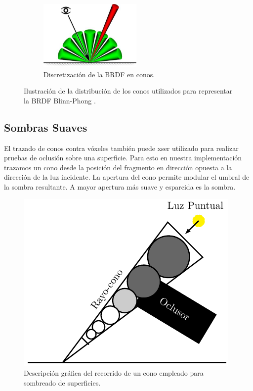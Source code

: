 \begin{figure}[H]
\begin{subfigure}[t]{.33\linewidth}
		\includegraphics[width=\linewidth]{media/brdfallcone.png}
		\caption*{Discretización de la BRDF en conos.}
	\end{subfigure}
	\caption{Ilustración de la distribución de los conos utilizados para representar la \ac{BRDF} Blinn-Phong \cite{Oliver:2012:UEE:2341836.2341909}.}
	\label{fig:brdf_cones2}
\end{figure}

\subsection{Sombras Suaves} %
\label{sub:sombras_suaves_con_trazado_de_conos}
El trazado de conos contra vóxeles también puede xser utilizado para realizar pruebas de oclusión sobre una superficie. Para esto en nuestra implementación trazamos un cono desde la posición del fragmento en dirección opuesta a la dirección de la luz incidente. La apertura del cono permite modular el umbral de la sombra resultante. A mayor apertura más suave y esparcida es la sombra.

\begin{figure}[H]
	\centering
	\captionsetup{justification=centering}
	\includegraphics[width=.4\linewidth]{media/shadow_cone.pdf}
	\caption{Descripción gráfica del recorrido de un cono empleado para sombreado de superficies.}
\end{figure}

